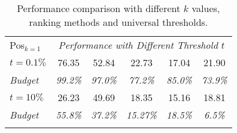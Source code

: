 \begin{table}[!t]
{\begin{tabular}{lccccc}
Pos$_{k=1}$ & \multicolumn{5}{c}{\textit{Performance with Different Threshold $t$ }}   
\\\arrayrulecolor{gray!60}\hline 
${t=0.1\%}$ &   76.35    &    52.84   &   22.73     &   17.04      &   21.90    \\
\textit{Budget}    &  \textit{99.2\%}     &   \textit{97.0\%}    &   \textit{77.2\%}     &      \textit{85.0\%}   &    \textit{73.9\%}   \\ 
${t=10\%}$ &  26.23     &   49.69    &    18.35    &    15.16     &   18.81    \\
\textit{Budget}    &   \textit{55.8\%}    &    \textit{37.2\%}   &   \textit{15.27\%}     &     \textit{18.5\%}    &   \textit{6.5\%}    \\ \arrayrulecolor{black}\bottomrule[1.3pt]
\end{tabular}
}
\caption{Performance comparison with different $k$ values, ranking methods and universal thresholds.\label{ablation}}
\end{table}
